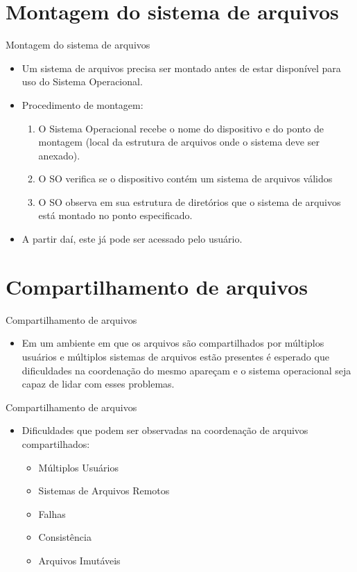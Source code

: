 \documentclass[10pt,brazil]{beamer}
\begin{document}
\section{Montagem do sistema de arquivos}%
\begin{frame}{Montagem do sistema de arquivos}
\begin{itemize}
\item Um sistema de arquivos precisa ser montado antes de estar disponível para uso do Sistema Operacional.
\item Procedimento de montagem:
	\begin{enumerate}
	\item O Sistema Operacional recebe o nome do dispositivo e do ponto de montagem (local da estrutura de arquivos onde o sistema deve ser anexado).
	\item O SO verifica se o dispositivo contém um sistema de arquivos válidos
	\item O SO observa em sua estrutura de diretórios que o sistema de arquivos está montado no ponto especificado.
	\end{enumerate}
\item A partir daí, este já pode ser acessado pelo usuário.
\end{itemize}

\end{frame}

\section{Compartilhamento de arquivos}%
\begin{frame}{Compartilhamento de arquivos}
	\begin{itemize}
	\item Em um ambiente em que os arquivos são compartilhados por múltiplos usuários e múltiplos sistemas de arquivos estão presentes é esperado que dificuldades na coordenação do mesmo apareçam e o sistema operacional seja capaz de lidar com esses problemas.
	\end{itemize}
\end{frame}

\begin{frame}{Compartilhamento de arquivos}
\begin{itemize}
\item Dificuldades que podem ser observadas na coordenação de arquivos compartilhados:
	\begin{itemize}
	\item Múltiplos Usuários
	\item Sistemas de Arquivos Remotos
	\item Falhas
	\item Consistência
	\item Arquivos Imutáveis
	\end{itemize}
\end{itemize}
\end{frame}
\end{document}
